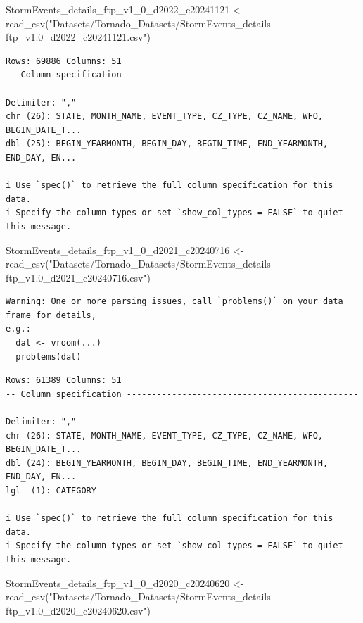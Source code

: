 \documentclass[
  letterpaper,
  DIV=11,
  numbers=noendperiod]{scrreprt}
\newenvironment{Shaded}{\begin{snugshade}}{\end{snugshade}}
\newcommand{\FunctionTok}[1]{\textcolor[rgb]{0.28,0.35,0.67}{#1}}
\newcommand{\NormalTok}[1]{\textcolor[rgb]{0.00,0.23,0.31}{#1}}
\newcommand{\OtherTok}[1]{\textcolor[rgb]{0.00,0.23,0.31}{#1}}
\newcommand{\StringTok}[1]{\textcolor[rgb]{0.13,0.47,0.30}{#1}}
\begin{document}
\begin{Shaded}
\begin{Highlighting}[]
\NormalTok{StormEvents\_details\_ftp\_v1\_0\_d2022\_c20241121 }\OtherTok{\textless{}{-}} \FunctionTok{read\_csv}\NormalTok{(}\StringTok{"Datasets/Tornado\_Datasets/StormEvents\_details{-}ftp\_v1.0\_d2022\_c20241121.csv"}\NormalTok{)}
\end{Highlighting}
\end{Shaded}

\begin{verbatim}
Rows: 69886 Columns: 51
-- Column specification --------------------------------------------------------
Delimiter: ","
chr (26): STATE, MONTH_NAME, EVENT_TYPE, CZ_TYPE, CZ_NAME, WFO, BEGIN_DATE_T...
dbl (25): BEGIN_YEARMONTH, BEGIN_DAY, BEGIN_TIME, END_YEARMONTH, END_DAY, EN...

i Use `spec()` to retrieve the full column specification for this data.
i Specify the column types or set `show_col_types = FALSE` to quiet this message.
\end{verbatim}

\begin{Shaded}
\begin{Highlighting}[]
\NormalTok{StormEvents\_details\_ftp\_v1\_0\_d2021\_c20240716 }\OtherTok{\textless{}{-}} \FunctionTok{read\_csv}\NormalTok{(}\StringTok{"Datasets/Tornado\_Datasets/StormEvents\_details{-}ftp\_v1.0\_d2021\_c20240716.csv"}\NormalTok{)}
\end{Highlighting}
\end{Shaded}

\begin{verbatim}
Warning: One or more parsing issues, call `problems()` on your data frame for details,
e.g.:
  dat <- vroom(...)
  problems(dat)
\end{verbatim}

\begin{verbatim}
Rows: 61389 Columns: 51
-- Column specification --------------------------------------------------------
Delimiter: ","
chr (26): STATE, MONTH_NAME, EVENT_TYPE, CZ_TYPE, CZ_NAME, WFO, BEGIN_DATE_T...
dbl (24): BEGIN_YEARMONTH, BEGIN_DAY, BEGIN_TIME, END_YEARMONTH, END_DAY, EN...
lgl  (1): CATEGORY

i Use `spec()` to retrieve the full column specification for this data.
i Specify the column types or set `show_col_types = FALSE` to quiet this message.
\end{verbatim}

\begin{Shaded}
\begin{Highlighting}[]
\NormalTok{StormEvents\_details\_ftp\_v1\_0\_d2020\_c20240620 }\OtherTok{\textless{}{-}} \FunctionTok{read\_csv}\NormalTok{(}\StringTok{"Datasets/Tornado\_Datasets/StormEvents\_details{-}ftp\_v1.0\_d2020\_c20240620.csv"}\NormalTok{)}
\end{Highlighting}
\end{Shaded}
\end{document}
